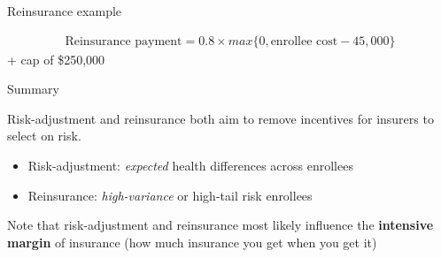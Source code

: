 \begin{frame}{Reinsurance example}

    \begin{align*}
        \text{Reinsurance payment} = 0.8 \times max\{0, \text{enrollee cost} - 45,000\}
    \end{align*}
    + cap of \$250,000\\
    \vspace{3mm}


\end{frame}
\begin{frame}{Summary}

    Risk-adjustment and reinsurance both aim to remove incentives for insurers to select on risk.\\
    \begin{itemize}
        \item Risk-adjustment: \textit{expected} health differences across enrollees
        \item Reinsurance: \textit{high-variance} or high-tail risk enrollees
    \end{itemize}    
    \vspace{3mm}

    Note that risk-adjustment and reinsurance most likely influence the \textbf{intensive margin} of insurance (how much insurance you get when you get it)
\end{frame}
